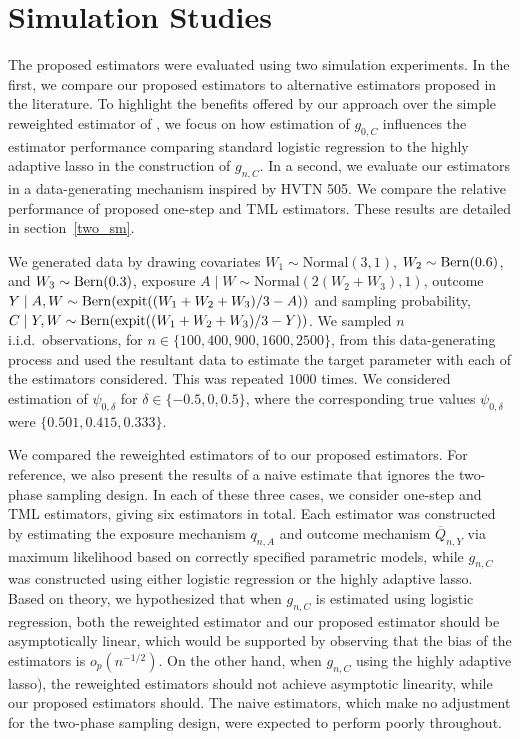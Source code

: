 \section{Simulation Studies}\label{two_sim}

The proposed estimators were evaluated using two simulation experiments. In the
first, we compare our proposed estimators to alternative estimators proposed in
the literature. To highlight the benefits offered by our approach over the
simple reweighted estimator of \citet{rose2011targeted2sd}, we focus on how
estimation of $g_{0,C}$ influences the estimator performance comparing standard
logistic regression to the highly adaptive lasso in the construction of
$g_{n,C}$. In a second, we evaluate our estimators in a data-generating
mechanism inspired by HVTN 505. We compare the relative performance of proposed
one-step and TML estimators. These results are detailed in
section~\ref{two_sm}.

We generated data by drawing covariates $W_1 \sim \mbox{Normal}(3, 1)$, $W_2
\sim \operatorname{Bern}(0.6)$, and $W_3 \sim \operatorname{Bern}(0.3)$, exposure $A \mid W \sim
\mbox{Normal}(2(W_2 + W_3), 1)$, outcome $Y \mid A, W \sim \operatorname{Bern} (\operatorname{expit} ((W_1
+ W_2 + W_3)/3 - A ))$ and sampling probability, $C \mid Y, W \sim \operatorname{Bern}
(\operatorname{expit} ((W_1 + W_2 + W_3)/3 - Y) )$. We sampled $n$ i.i.d.~observations, for
$n \in \{100, 400, 900, 1600, 2500\}$, from this data-generating process and
used the resultant data to estimate the target parameter with each of the
estimators considered. This was repeated $1000$ times. We considered estimation
of $\psi_{0, \delta}$ for $\delta \in \{-0.5, 0, 0.5\}$, where the corresponding
true values $\psi_{0, \delta}$ were $\{0.501, 0.415, 0.333\}$.

We compared the reweighted estimators of \citet{rose2011targeted2sd} to our
proposed estimators. For reference, we also present the results of a naive
estimate that ignores the two-phase sampling design. In each of these three
cases, we consider one-step and TML estimators, giving six estimators in total.
Each estimator was constructed by estimating the exposure mechanism $q_{n,A}$
and outcome mechanism $\overline{Q}_{n,Y}$ via maximum likelihood based on
correctly specified parametric models, while $g_{n,C}$ was constructed using
either logistic regression or the highly adaptive lasso. Based on theory, we
hypothesized that when $g_{n,C}$ is estimated using logistic regression, both
the reweighted estimator and our proposed estimator should be asymptotically
linear, which would be supported by observing that the bias of the estimators is
$o_p(n^{-1/2})$. On the other hand, when $g_{n,C}$ using the highly adaptive
lasso), the reweighted estimators should not achieve asymptotic linearity, while
our proposed estimators should. The naive estimators, which make no adjustment
for the two-phase sampling design, were expected to perform poorly throughout.

